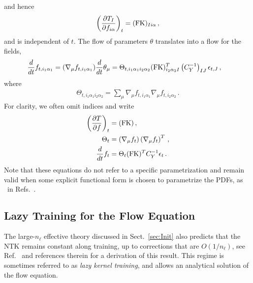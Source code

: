 and hence
\begin{align}
    \label{eq:dTbydf}
    \left(\frac{\partial T_I}{\partial f_{i\alpha}}\right)_t =
        (\mathrm{FK})_{Ii\alpha}\, ,
\end{align}
and is independent of $t$. The flow of parameters $\theta$ translates into a flow for the fields,
\begin{align}
    \label{eq:NTKFlow}
    \frac{d}{dt} &f_{t,i_1\alpha_1} = (\nabla_\mu f_{t,i_1\alpha_1}) \frac{d}{dt} \theta_\mu =
      \Theta_{t,i_1\alpha_1i_2\alpha_2}
      (\mathrm{FK})^T_{i_2\alpha_2I} \left(C_Y^{-1}\right)_{IJ} \epsilon_{t,J}\, ,
\end{align}
where
\begin{align}
    \label{eq:NTKDef}
    \Theta_{t,i_1\alpha_1i_2\alpha_2} = \sum_\mu
    \nabla_\mu f_{t,i_1\alpha_1} \nabla_\mu f_{t,i_2\alpha_2}\, .
\end{align}
For clarity, we often omit indices and write
\begin{align}
    \left(\frac{\partial T}{\partial f}\right)_t
        &= (\mathrm{FK})\, , \\
    \Theta_t
        &= \left(\nabla_\mu f_t\right) \left(\nabla_\mu f_t\right)^T\, , \\
    \label{eq:FlowEquationNoIndices}
    \frac{d}{dt} f_t
        &= \Theta_t (\mathrm{FK})^T C_Y^{-1} \epsilon_t\, .
\end{align}
Note that these equations do not refer to a specific parametrization and remain valid when some
explicit functional form is chosen to parametrize the PDFs, as \eg\ in
Refs.~\cite{Bailey:2020ooq,Hou:2019efy}.

\subsection{Lazy Training for the Flow Equation}
\label{sec:Lazy}

The large-$n_{\ell}$ effective theory discussed in Sect.~\ref{sec:Init} also predicts that
the NTK remains constant along training, up to corrections that are $O(1/n_{\ell})$, see
Ref.~\cite{DBLP:journals/corr/abs-1806-07572} and references therein for a derivation of this result.
This regime is sometimes referred to as {\em lazy kernel training}, and allows an analytical
solution of the flow equation.

